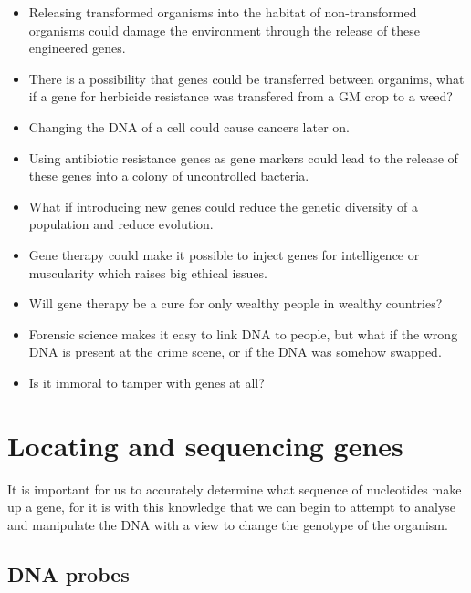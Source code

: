 \documentclass{article}
\begin{document}
\begin{itemize}
	
	\item Releasing transformed organisms into the habitat of non-transformed
	organisms could damage the environment through the release of these
	engineered genes.

	\item There is a possibility that genes could be transferred between
	organims, what if a gene for herbicide resistance was transfered from a GM
	crop to a weed?

	\item Changing the DNA of a cell could cause cancers later on.

	\item Using antibiotic resistance genes as gene markers could lead to the
	release of these genes into a colony of uncontrolled bacteria.

	\item What if introducing new genes could reduce the genetic diversity of a
	population and reduce evolution.

	\item Gene therapy could make it possible to inject genes for intelligence
	or muscularity which raises big ethical issues.

	\item Will gene therapy be a cure for only wealthy people in wealthy
	countries?

	\item Forensic science makes it easy to link DNA to people, but what if the
	wrong DNA is present at the crime scene, or if the DNA was somehow swapped.

	\item Is it immoral to tamper with genes at all?

\end{itemize}


\section*{Locating and sequencing genes}

It is important for us to accurately determine what sequence of nucleotides make
up a gene, for it is with this knowledge that we can begin to attempt to analyse
and manipulate the DNA with a view to change the genotype of the organism.

\subsection*{DNA probes}
\end{document}
